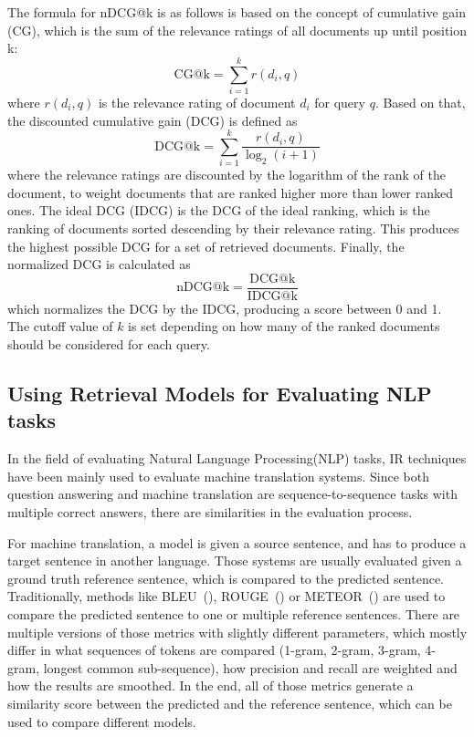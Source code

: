 The formula for nDCG@k is as follows is based on the concept of cumulative gain (CG), which is the sum of the relevance ratings of all documents up until position k:
\[ \text{CG@k} = \sum_{i=1}^{k} r(d_i,q) \]
where $r(d_i,q)$ is the relevance rating of document $d_i$ for query $q$.
Based on that, the discounted cumulative gain (DCG) is defined as
\[ \text{DCG@k} = \sum_{i=1}^{k} \frac{r(d_i,q)}{\log_2(i+1)} \]
where the relevance ratings are discounted by the logarithm of the rank of the document, to weight documents that are ranked higher more than lower ranked ones.
The ideal DCG (IDCG) is the DCG of the ideal ranking, which is the ranking of documents sorted descending by their relevance rating.
This produces the highest possible DCG for a set of retrieved documents.
Finally, the normalized DCG is calculated as
\[ \text{nDCG@k} = \frac{\text{DCG@k}}{\text{IDCG@k}} \]
which normalizes the DCG by the IDCG, producing a score between 0 and 1.
The cutoff value of $k$ is set depending on how many of the ranked documents should be considered for each query.

\subsection{Using Retrieval Models for Evaluating NLP tasks}\label{sec:eval-mts-ir}
In the field of evaluating Natural Language Processing(NLP) tasks, IR techniques have been mainly used to evaluate machine translation systems.
Since both question answering and machine translation are sequence-to-sequence tasks with multiple correct answers, there are similarities in the evaluation process.

For machine translation, a model is given a source sentence, and has to produce a target sentence in another language.
Those systems are usually evaluated given a ground truth reference sentence, which is compared to the predicted sentence.
Traditionally, methods like BLEU~(\cite{papineni:2002:Bleu}), ROUGE~(\cite{lin:2004:Rouge}) or METEOR~(\cite{banerjee:2005:METEOR}) are used to compare the predicted sentence to one or multiple reference sentences.
There are multiple versions of those metrics with slightly different parameters, which mostly differ in what sequences of tokens are compared (1-gram, 2-gram, 3-gram, 4-gram, longest common sub-sequence), how precision and recall are weighted and how the results are smoothed.
In the end, all of those metrics generate a similarity score between the predicted and the reference sentence, which can be used to compare different models.

